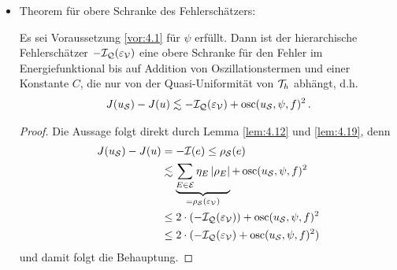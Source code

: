 \begin{itemize}
\begin{proof}
\begin{align*}
\end{align*}
wobei wir als letztes die Ungleichung von Young mit einem $\eps > 0$ verwendet haben und
\[
	\mcal E^0 = \bigcup_{p \in \mcal N}\mcal E^0_p \, , \quad \mcal E^+ = \bigcup_{p \in \mcal N} \mcal E_p^+ \, .
\] 
Wählen wir $\eps \le C$, so ergibt sich nach leichtem Umstellen der Ungleichung
\begin{align*}
	c(\eps) \rho_{\mcal S}(e) & \le \frac \eps2 \(\sum_{E\in \mcal E^+} \abs{\rho_E}^2+\osc_2(u_{\mcal S},\psi,f)^2\) + \frac 1{2\eps} \osc_1(u_{\mcal S},f)^2 + \sum_{E\in \mcal E^0} d_E \, \abs{\rho_E} \\
	& \le \(1+\frac 1{2\eps}\) \sum_{E\in \mcal E_p} \eta_E \, \abs{\rho_E}+ \(\frac\eps 2 + \frac 1{2\eps}\) \(\osc_2(u_{\mcal S},\psi,f)^2+\osc_1(u_{\mcal S},f)^2\) \\
	& \lesssim \sum_{E\in \mcal E_p} \eta_E \, \abs{\rho_E} + \osc(u_{\mcal S},\psi,f)^2 
\end{align*}
mit $c(\eps) = \eps-\frac 1{2\eps}$ und $\eta_E$ wie in \eqref{eq:4.11} definiert. Damit folgt die Behauptung.
\end{proof}




\item Theorem für obere Schranke des Fehlerschätzers:
\begin{theorem}\label{theorem:4.22}
Es sei Voraussetzung \ref{vor:4.1} für $\psi$ erfüllt. Dann ist der hierarchische Fehlerschätzer $-\mathcal I_{\mathcal Q}(\varepsilon_{\mathcal V})$ eine obere Schranke für den Fehler im Energiefunktional bis auf Addition von Oszillationstermen und einer Konstante $C$, die nur von der Quasi-Uniformität von $\mathcal T_h$ abhängt, d.h.
\begin{align}
	J(u_{\mathcal S}) - J(u) \lesssim -\mathcal I_{\mathcal Q}(\varepsilon_{\mathcal V}) + \operatorname{osc} (u_{\mathcal S},\psi,f)^2 \, .
\end{align}
\end{theorem}

\begin{proof}
Die Aussage folgt direkt durch Lemma \ref{lem:4.12} und \ref{lem:4.19}, denn
\begin{align*}
	J(u_{\mathcal S})-J(u) & = - \mathcal I (e) \le \rho_{\mathcal S}(e) \\
	& \lesssim \underbrace{\sum_{E\in \mathcal E}\eta_E \, \lvert \rho_E\rvert}_{=\rho_{\mathcal S}(\varepsilon_{\mathcal V})} + \operatorname{osc} (u_{\mathcal S},\psi,f)^2 \\
	& \le 2\cdot (-\mathcal I_{\mathcal Q}(\varepsilon_{\mathcal V}))+ \operatorname{osc} (u_{\mathcal S},\psi,f)^2 \\
	& \le 2 \cdot (-\mathcal I_{\mathcal Q}(\varepsilon_{\mathcal V})+ \operatorname{osc} (u_{\mathcal S},\psi,f)^2)
\end{align*}
und damit folgt die Behauptung.
\end{proof}


\end{itemize}
